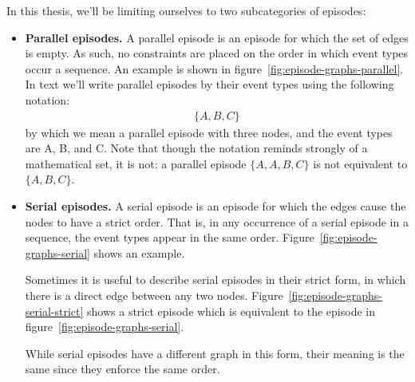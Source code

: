 In this thesis, we'll be limiting ourselves to two subcategories of episodes:
\begin{itemize}
\item \textbf{Parallel episodes.} A parallel episode is an episode for which the set of edges is empty. As such, no constraints are placed on the order in which event types occur a sequence. An example is shown in figure~\ref{fig:episode-graphs-parallel}. In text we'll write parallel episodes by their event types using the following notation:
\begin{align*}
    \{ A, B, C \}
\end{align*}
by which we mean a parallel episode with three nodes, and the event types are A, B, and C. Note that though the notation reminds strongly of a mathematical set, it is not: a parallel episode $ \{ A, A, B, C \} $ is not equivalent to $ \{ A, B, C \} $.

\item \textbf{Serial episodes.} A serial episode is an episode for which the edges cause the nodes to have a strict order. That is, in any occurrence of a serial episode in a sequence, the event types appear in the same order. Figure~\ref{fig:episode-graphs-serial} shows an example.

Sometimes it is useful to describe serial episodes in their strict form, in which there is a direct edge between any two nodes. Figure~\ref{fig:episode-graphs-serial-strict} shows a strict episode which is equivalent to the episode in figure~\ref{fig:episode-graphs-serial}.

While serial episodes have a different graph in this form, their meaning is the same since they enforce the same order.

\end{itemize}

